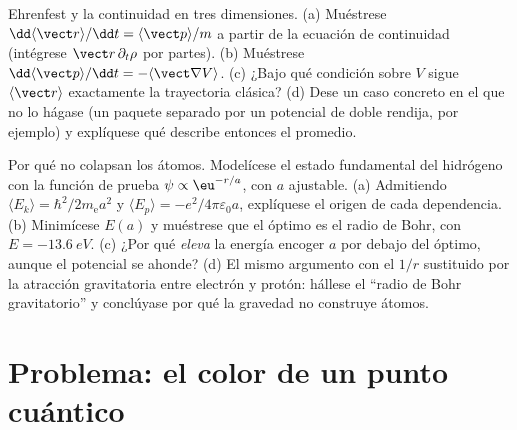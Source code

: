 \begin{exercise}[$\star\star\star$]\label{exo:b3:schrodinger-three-dimensions:11}
Ehrenfest y la continuidad en tres dimensiones. (a) Muéstrese
$\dd\langle\vect r\rangle/\dd t = \langle\vect p\rangle/m$ a partir de la
ecuación de continuidad (intégrese $\vect r\,\partial_t\rho$ por partes).
(b) Muéstrese $\dd\langle\vect p\rangle/\dd t =
-\langle\vect\nabla V\rangle$. (c) ¿Bajo qué condición sobre $V$ sigue
$\langle\vect r\rangle$ exactamente la trayectoria clásica? (d)
Dese un caso concreto en el que no lo hágase (un paquete separado por un
potencial de doble rendija, por ejemplo) y explíquese qué describe entonces el
promedio.
\end{exercise}

\begin{exercise}[$\star\star\star$]\label{exo:b3:schrodinger-three-dimensions:12}
Por qué no colapsan los átomos. Modelícese el estado fundamental del
hidrógeno con la función de prueba $\psi \propto \eu^{-r/a}$, con $a$
ajustable. (a) Admitiendo $\langle E_k\rangle = \hbar^2/2m_{\text{e}}a^2$ y
$\langle E_p\rangle = -e^2/4\pi\varepsilon_0a$, explíquese el origen de cada
dependencia. (b) Minimícese $E(a)$ y muéstrese que el óptimo es el radio de
Bohr, con $E = \qty{-13.6}{eV}$. (c) ¿Por qué \emph{eleva} la energía
encoger $a$ por debajo del óptimo, aunque el potencial se ahonde? (d) El
mismo argumento con el $1/r$ sustituido por la atracción gravitatoria entre
electrón y protón: hállese el ``radio de Bohr gravitatorio'' y conclúyase por
qué la gravedad no construye átomos.
\end{exercise}

\section{Problema: el color de un punto cuántico}

